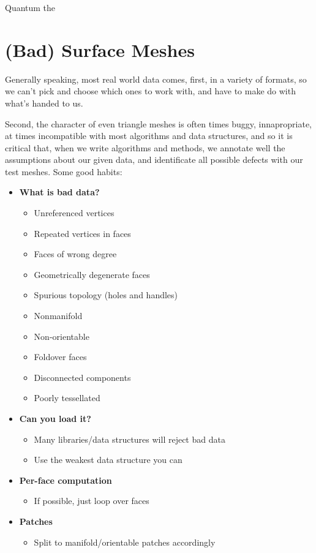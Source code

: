 Quantum the

\section{(Bad) Surface Meshes}

Generally speaking, most real world data comes, first, in a variety
of formats, so we can't pick and choose which ones to work with, and
have to make do with what's handed to us.

\spa

Second, the character of even triangle meshes is often times
buggy, innapropriate, at times incompatible with most algorithms
and data structures, and so it is critical that, when we write
algorithms and methods, we annotate well the assumptions about
our given data, and identificate all possible defects with our
test meshes. Some good habits:


\begin{itemize}
    \item \textbf{What is bad data?}
        \begin{itemize}
            \item Unreferenced vertices
            \item Repeated vertices in faces
            \item Faces of wrong degree
            \item Geometrically degenerate faces
            \item Spurious topology (holes and handles)
            \item Nonmanifold
            \item Non-orientable
            \item Foldover faces
            \item Disconnected components
            \item Poorly tessellated
        \end{itemize}
    
    \item \textbf{Can you load it?}
    \begin{itemize}
        \item Many libraries/data structures will reject bad data
        \item Use the weakest data structure you can
    \end{itemize}

    \item \textbf{Per-face computation}
    \begin{itemize}
        \item If possible, just loop over faces
    \end{itemize}

    \item \textbf{Patches}
    \begin{itemize}
        \item Split to manifold/orientable patches accordingly
    \end{itemize}
\end{itemize}


